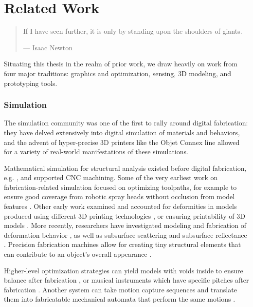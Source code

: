 \chapter{Related Work}

\begin{quote}
If I have seen further, it is only by standing upon the shoulders of giants.

--- Isaac Newton
\end{quote}

Situating this thesis in the realm of prior work, we draw heavily on work from four major traditions: graphics and optimization, sensing, 3D modeling, and prototyping tools.

\subsection{Simulation}

    The simulation community was one of the first to rally around digital fabrication: they have delved extensively into digital simulation of materials and behaviors, and the advent of hyper-precise 3D printers like the Objet Connex line allowed for a variety of real-world manifestations of these simulations.
    
    Mathematical simulation for structural analysis existed before digital fabrication, e.g. \cite{fleury-optimization}, and supported CNC machining. Some of the very earliest work on fabrication-related simulation focused on optimizing toolpaths, for example to ensure good coverage from robotic spray heads without occlusion from model features \cite{gursoz-noodles}. Other early work examined and accounted for deformities in models produced using different 3D printing technologies \cite{brown-simulate,hsu-numerical}, or ensuring printability of 3D models \cite{barequet-gaps,bohn-shellclosure}. More recently, researchers have investigated modeling and fabrication of deformation behavior \cite{bickel-deformation}, as well as subsurface scattering \cite{hasan-subsurface} and subsurface reflectance \cite{weyrich-reflectance}. Precision fabrication machines allow for creating tiny structural elements that can contribute to an object's overall appearance \cite{lan-appearance}.
    
    Higher-level optimization strategies can yield models with voids inside to ensure balance after fabrication \cite{prevost-makeitstand}, or musical instruments which have specific pitches after fabrication \cite{umetani-metallophone}. Another system can take motion capture sequences and translate them into fabricatable mechanical automata that perform the same motions \cite{ceylan-automata}.
    

